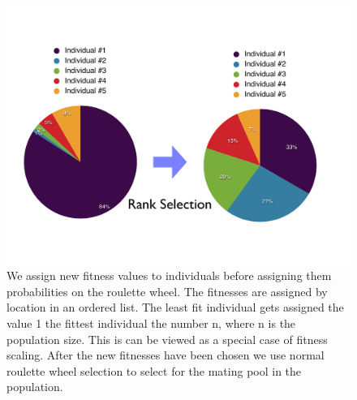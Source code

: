 \begin{figure}[tb] %
   \centering
   \includegraphics[width=\textwidth]{chapter_ga/plots/rank_select.pdf} 
   \caption[Rank Selection with subsequent Roulette Wheel Selection]{We assign new fitness values to individuals before assigning them probabilities on the roulette wheel. The fitnesses are assigned by location in an ordered list. The least fit individual gets assigned the value 1 the fittest individual the number n, where n is the population size. This is can be viewed as a special case of fitness scaling. After the new fitnesses have been chosen we use normal roulette wheel selection to select for the mating pool in the population. }
   \label{fig:rankselection}
\end{figure}

